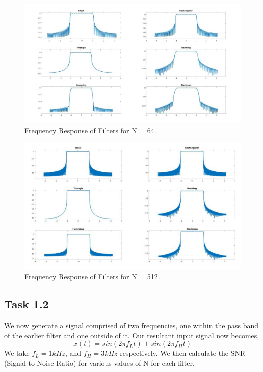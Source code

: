 \documentclass{article}
\begin{document}
\begin{figure}[H]
    \includegraphics[width=\textwidth]
    {N=64.jpg}
    \caption{Frequency Response of Filters for N = 64.}
    \end{figure}

    \begin{figure}[H]
    \includegraphics[width=\textwidth]
    {N=512.jpg}
    \caption{Frequency Response of Filters for N = 512.}
    \end{figure}

\subsection{Task 1.2}
We now generate a signal comprised of two frequencies, one within the pass band of the earlier filter and one outside of it. Our resultant input signal now becomes,
\begin{equation}
    x(t) = sin(2{\pi}f_{L}t) + sin(2{\pi}f_{H}t)
\end{equation}
We take $f_{L} = 1kHz$, and $f_{H} = 3kHz$ respectively. We then calculate the SNR (Signal to Noise Ratio) for various values of N for each filter.
\end{document}
